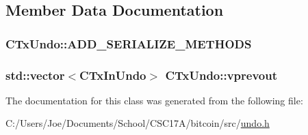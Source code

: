\subsection{Member Data Documentation}
\hypertarget{class_c_tx_undo_a8b7b4f167a00e200723165b3446cc4c4}{}
\subsubsection[{A\+D\+D\+\_\+\+S\+E\+R\+I\+A\+L\+I\+Z\+E\+\_\+\+M\+E\+T\+H\+O\+D\+S}]{\setlength{\rightskip}{0pt plus 5cm}C\+Tx\+Undo\+::\+A\+D\+D\+\_\+\+S\+E\+R\+I\+A\+L\+I\+Z\+E\+\_\+\+M\+E\+T\+H\+O\+D\+S}\label{class_c_tx_undo_a8b7b4f167a00e200723165b3446cc4c4}
\hypertarget{class_c_tx_undo_a035e62f0b46f0d4ba392dad686ed18de}{}
\subsubsection[{vprevout}]{\setlength{\rightskip}{0pt plus 5cm}std\+::vector$<${\bf C\+Tx\+In\+Undo}$>$ C\+Tx\+Undo\+::vprevout}\label{class_c_tx_undo_a035e62f0b46f0d4ba392dad686ed18de}


The documentation for this class was generated from the following file\+:\begin{DoxyCompactItemize}
\item 
C\+:/\+Users/\+Joe/\+Documents/\+School/\+C\+S\+C17\+A/bitcoin/src/\hyperlink{undo_8h}{undo.\+h}\end{DoxyCompactItemize}
